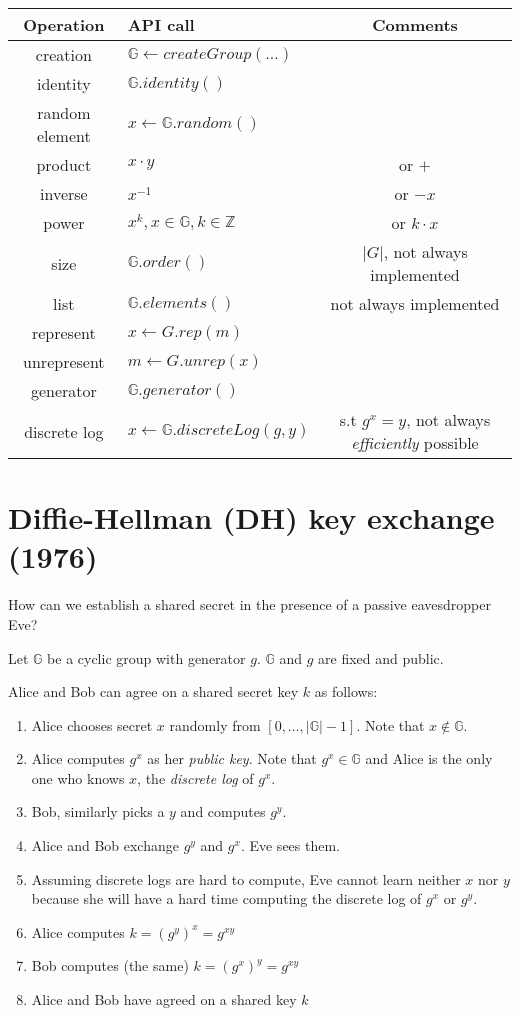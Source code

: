 \documentclass[12pt]{article}
\newcommand{\G}{\mathbb{G}}
\begin{document}
\begin{center}
\begin{tabular}{ c | l | c }
Operation & API call & Comments \\
\hline\hline
creation & $\G \leftarrow createGroup(\dots)$ &\\
identity & $\G.identity()$ &\\
random element & $x \leftarrow \G.random()$ &\\
product & $x \cdot y$ & or $+$\\
inverse & $x^{-1}$ & or $-x$\\
power & $x^k, x \in \G, k \in \mathbb{Z}$ & or $k\cdot x$\\
size & $\G.order()$ & $|G|$, not always implemented\\
list & $\G.elements()$ & not always implemented\\
represent & $x \leftarrow G.rep(m)$ &\\
unrepresent & $m \leftarrow G.unrep(x)$ &\\
generator & $\G.generator()$ &\\
discrete log & $x \leftarrow \G.discreteLog(g, y)$ & s.t $g^x = y$, not always
\emph{efficiently} possible \\
\end{tabular}
\end{center}

\section{Diffie-Hellman (DH) key exchange (1976)}

How can we establish a shared secret in the presence of a passive eavesdropper
Eve?

Let $\G$ be a cyclic group with generator $g$. $\G$ and $g$ are fixed and public.

Alice and Bob can agree on a shared secret key $k$ as follows:

\begin{enumerate}
  \item Alice chooses secret $x$ randomly from $[0, \dots, |\G|-1]$. Note that
  $x \notin \G$.
  \item Alice computes $ g^x$ as her \emph{public key}. Note that $g^x \in \G$
  and Alice is the only one who knows $x$, the \emph{discrete log} of $g^x$.
  \item Bob, similarly picks a $y$ and computes $g^y$.
  \item Alice and Bob exchange $g^y$ and $g^x$. Eve sees them.
  \item Assuming discrete logs are hard to compute, Eve cannot learn neither $x$
  nor $y$ because she will have a hard time computing the discrete log of $g^x$ or
  $g^y$.
  \item Alice computes $k = (g^y)^x = g^{xy}$
  \item Bob computes (the same) $k = (g^x)^y = g^{xy}$
  \item Alice and Bob have agreed on a shared key $k$
\end{enumerate}
\end{document}
